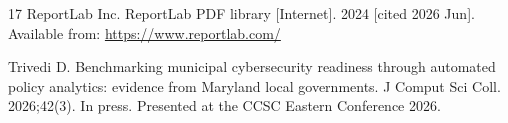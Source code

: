 \begin{thebibliography}{17}
ReportLab Inc. ReportLab PDF library [Internet]. 2024 [cited 2026 Jun].
Available from: \url{https://www.reportlab.com/}

Trivedi D. Benchmarking municipal cybersecurity readiness through automated
policy analytics: evidence from Maryland local governments. J Comput Sci Coll.
2026;42(3). In press. Presented at the CCSC Eastern Conference 2026.

\end{thebibliography}

